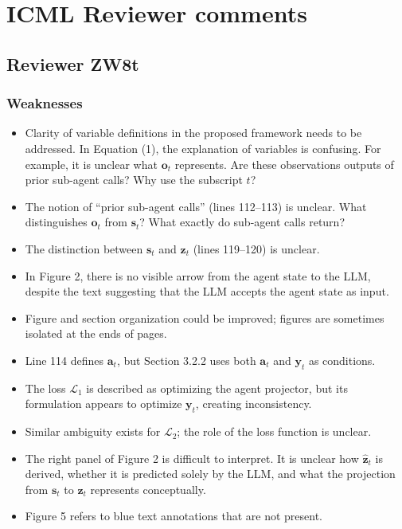 \section{ICML Reviewer comments}

\subsection*{Reviewer ZW8t}

\subsubsection*{Weaknesses}

\begin{itemize}
    \item Clarity of variable definitions in the proposed framework needs to be addressed. In Equation (1), the explanation of variables is confusing. For example, it is unclear what $\mathbf{o}_t$ represents. Are these observations outputs of prior sub-agent calls? Why use the subscript $t$?
    \item The notion of ``prior sub-agent calls'' (lines 112--113) is unclear. What distinguishes $\mathbf{o}_t$ from $\mathbf{s}_t$? What exactly do sub-agent calls return?
    \item The distinction between $\mathbf{s}_t$ and $\mathbf{z}_t$ (lines 119--120) is unclear.
    \item In Figure 2, there is no visible arrow from the agent state to the LLM, despite the text suggesting that the LLM accepts the agent state as input.
    \item Figure and section organization could be improved; figures are sometimes isolated at the ends of pages.
    \item Line 114 defines $\mathbf{a}_t$, but Section 3.2.2 uses both $\mathbf{a}_t$ and $\mathbf{y}_t$ as conditions.
    \item The loss $\mathcal{L}_1$ is described as optimizing the agent projector, but its formulation appears to optimize $\mathbf{y}_t$, creating inconsistency.
    \item Similar ambiguity exists for $\mathcal{L}_2$; the role of the loss function is unclear.
    \item The right panel of Figure 2 is difficult to interpret. It is unclear how $\hat{\mathbf{z}}_t$ is derived, whether it is predicted solely by the LLM, and what the projection from $\mathbf{s}_t$ to $\mathbf{z}_t$ represents conceptually.
    \item Figure 5 refers to blue text annotations that are not present.

\end{itemize}
